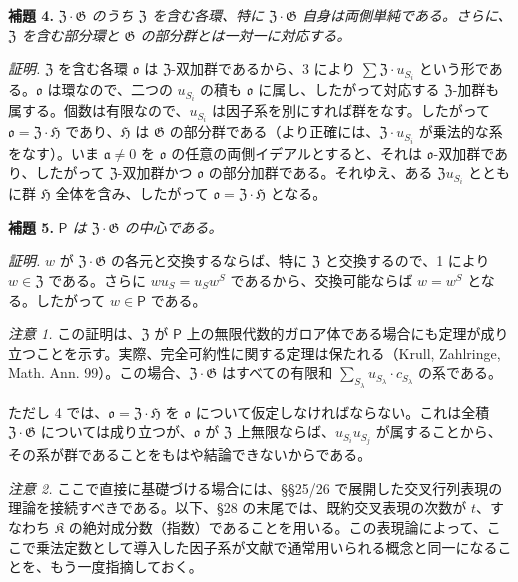 \noindent\textbf{補題 4.} \emph{\(\mathfrak Z\cdot\mathfrak G\) のうち \(\mathfrak Z\) を含む各環、特に \(\mathfrak Z\cdot\mathfrak G\) 自身は両側単純である。さらに、\(\mathfrak Z\) を含む部分環と \(\mathfrak G\) の部分群とは一対一に対応する。}

\noindent\emph{証明.} \(\mathfrak Z\) を含む各環 \(\mathfrak o\) は \(\mathfrak Z\)-双加群であるから、3 により \(\sum\mathfrak Z\cdot u_{S_i}\) という形である。\(\mathfrak o\) は環なので、二つの \(u_{S_i}\) の積も \(\mathfrak o\) に属し、したがって対応する \(\mathfrak Z\)-加群も属する。個数は有限なので、\(u_{S_i}\) は因子系を別にすれば群をなす。したがって \(\mathfrak o=\mathfrak Z\cdot\mathfrak H\) であり、\(\mathfrak H\) は \(\mathfrak G\) の部分群である（より正確には、\(\mathfrak Z\cdot u_{S_i}\) が乗法的な系をなす）。いま \(\mathfrak a\ne0\) を \(\mathfrak o\) の任意の両側イデアルとすると、それは \(\mathfrak o\)-双加群であり、したがって \(\mathfrak Z\)-双加群かつ \(\mathfrak o\) の部分加群である。それゆえ、ある \(\mathfrak Zu_{S_i}\) とともに群 \(\mathfrak H\) 全体を含み、したがって \(\mathfrak o=\mathfrak Z\cdot\mathfrak H\) となる。

\noindent\textbf{補題 5.} \emph{\(\mathsf P\) は \(\mathfrak Z\cdot\mathfrak G\) の中心である。}

\noindent\emph{証明.} \(w\) が \(\mathfrak Z\cdot\mathfrak G\) の各元と交換するならば、特に \(\mathfrak Z\) と交換するので、1 により \(w\in\mathfrak Z\) である。さらに \(wu_S=u_Sw^S\) であるから、交換可能ならば \(w=w^S\) となる。したがって \(w\in\mathsf P\) である。

\noindent\emph{注意 1.} この証明は、\(\mathfrak Z\) が \(\mathsf P\) 上の無限代数的ガロア体である場合にも定理が成り立つことを示す。実際、完全可約性に関する定理は保たれる（Krull, Zahlringe, Math. Ann. 99）。この場合、\(\mathfrak Z\cdot\mathfrak G\) はすべての有限和 \(\sum_{S_\lambda}u_{S_\lambda}\cdot c_{S_\lambda}\) の系である。

ただし 4 では、\(\mathfrak o=\mathfrak Z\cdot\mathfrak H\) を \(\mathfrak o\) について仮定しなければならない。これは全積 \(\mathfrak Z\cdot\mathfrak G\) については成り立つが、\(\mathfrak o\) が \(\mathfrak Z\) 上無限ならば、\(u_{S_i}u_{S_j}\) が属することから、その系が群であることをもはや結論できないからである。

\noindent\emph{注意 2.} ここで直接に基礎づける場合には、\S\S 25/26 で展開した交叉行列表現の理論を接続すべきである。以下、\S 28 の末尾では、既約交叉表現の次数が \(t\)、すなわち \(\mathfrak K\) の絶対成分数（指数）であることを用いる。この表現論によって、ここで乗法定数として導入した因子系が文献で通常用いられる概念と同一になることを、もう一度指摘しておく。

